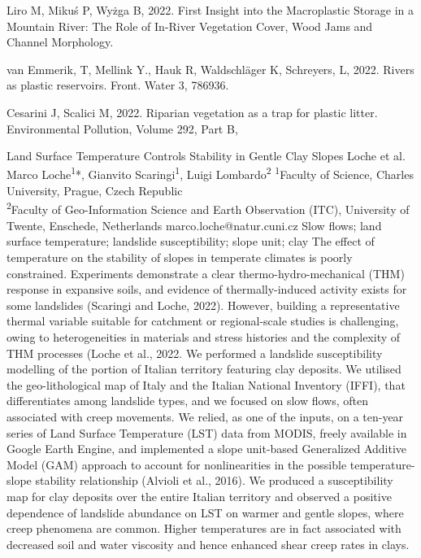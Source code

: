 {Liro M, Mikuś P, Wyżga B, 2022. First Insight into the Macroplastic Storage in a Mountain River: The Role of In-River Vegetation Cover, Wood Jams and Channel Morphology. 

van Emmerik, T, Mellink Y., Hauk R, Waldschläger K, Schreyers, L, 2022. Rivers as plastic reservoirs. Front. Water 3, 786936. 

Cesarini J, Scalici M, 2022. Riparian vegetation as a trap for plastic litter. Environmental Pollution, Volume 292, Part B, 
}

\abstract
{Land Surface Temperature Controls Stability in Gentle Clay Slopes} 
{Loche et al.} 
{Marco Loche\textsuperscript{1}*, Gianvito Scaringi\textsuperscript{1}, Luigi Lombardo\textsuperscript{2}} 
{\TLtag} 
{
\textsuperscript{1}Faculty of Science, Charles University, Prague, Czech Republic\\
\textsuperscript{2}Faculty of Geo-Information Science and Earth Observation (ITC), University of Twente, Enschede, Netherlands
}
{marco.loche@natur.cuni.cz}  %
{Slow flows; land surface temperature; landslide susceptibility; slope unit; clay}
{The effect of temperature on the stability of slopes in temperate climates is poorly constrained. Experiments demonstrate a clear thermo-hydro-mechanical (THM) response in expansive soils, and evidence of thermally-induced activity exists for some landslides (Scaringi and Loche, 2022). However, building a representative thermal variable suitable for catchment or regional-scale studies is challenging, owing to heterogeneities in materials and stress histories and the complexity of THM processes (Loche et al., 2022. We performed a landslide susceptibility modelling of the portion of Italian territory featuring clay deposits. We utilised the geo-lithological map of Italy and the Italian National Inventory (IFFI), that differentiates among landslide types, and we focused on slow flows, often associated with creep movements. We relied, as one of the inputs, on a ten-year series of Land Surface Temperature (LST) data from MODIS, freely available in Google Earth Engine, and implemented a slope unit-based Generalized Additive Model (GAM) approach to account for nonlinearities in the possible temperature-slope stability relationship (Alvioli et al., 2016). We produced a susceptibility map for clay deposits over the entire Italian territory and observed a positive dependence of landslide abundance on LST on warmer and gentle slopes, where creep phenomena are common. Higher temperatures are in fact associated with decreased soil and water viscosity and hence enhanced shear creep rates in clays.
}
